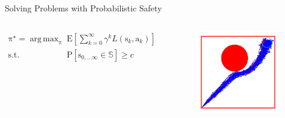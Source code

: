 \documentclass[lecture]{beamer}
\DeclareMathOperator*{\argmax}{arg\,max}
\newcommand{\vect}[1]{\ensuremath{\boldsymbol{\mathrm{#1}}}}
\begin{document}
\begin{frame}{\normalsize Solving Problems with Probabilistic Safety}
\footnotesize
\vspace{-.7cm}
\begin{columns}[t]
\begin{columns}[t]


\begin{alertblock}{}
\vspace{-.2cm}
\begin{align*}
\vect\pi^\star = \argmax_{\vect\pi}&\quad\mathrm E\left[ \sum_{k=0}^\infty \gamma^kL\left(\vect s_k,\vect a_k\right)\right]\\
\mathrm{s.t.}&\quad \mathrm{P}\left[ \vect s_{0,\ldots\infty}\in \mathbb S\right] \geq c
\end{align*}
\end{alertblock}
\end{columns}

 \begin{figure}
   \includegraphics[width=0.98\textwidth]{Codes/BasicsSafety/ProbabilisticModel.pdf}%
  \end{figure}
\end{columns}


\end{frame}
\end{document}
